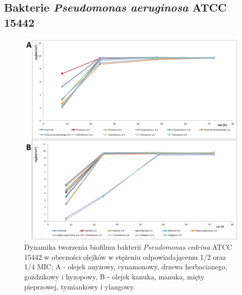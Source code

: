 \documentclass[11pt,a4paper]{report}
\begin{document}
\subsection{Bakterie \textit{Pseudomonas aeruginosa} ATCC 15442}

\begin{figure}[!h]
\begin{center}
\includegraphics[scale=0.50]{img/ref-c.png}
\caption{Dynamika tworzenia biofilmu bakterii \textit{Pseudomonas cedrina} ATCC 15442 w obecności olejków w stężeniu odpowiadającemu 1/2 oraz 1/4 MIC; A - olejek anyżowy, cynamonowy, drzewa herbacianego, goździkowy i hyzopowy, B - olejek kanuka, manuka, mięty pieprzowej, tymiankowy i ylangowy.}\label{ref-c}
\end{center} 
\end{figure}
\end{document}
